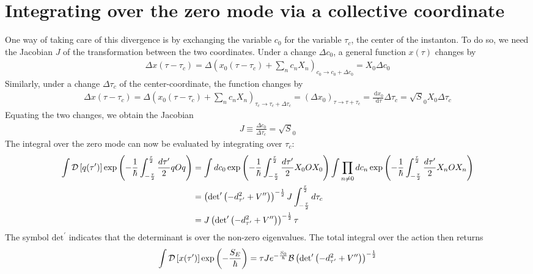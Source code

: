 \documentclass{article}
\begin{document}
\section{Integrating over the zero mode via a collective coordinate}
One way of taking care of this divergence is by exchanging the variable \(c_0\) for the variable \(\tau_c\), the center of the instanton. To do so, we need the Jacobian \(J\) of the transformation between the two coordinates. Under a change \(\Delta c_0\), a general function \(x(\tau)\) changes by
\begin{equation}\begin{aligned}
	\Delta x(\tau - \tau_c) = \Delta \left( x_0(\tau - \tau_c) + \sum_n c_n X_n \right)_{c_0 \to c_0 + \Delta c_0} = X_0 \Delta c_0
\end{aligned}\end{equation}
Similarly, under a change \(\Delta \tau_c\) of the center-coordinate, the function changes by
\begin{equation}\begin{aligned}
	\Delta x(\tau - \tau_c) = \Delta \left( x_0(\tau - \tau_c) + \sum_n c_n X_n \right)_{\tau_c \to \tau_c + \Delta \tau_c} = \left(\Delta x_0\right)_{\tau \to \tau + \tau_c} = \frac{\:\mathrm{d}x_0}{\:\mathrm{d}\tau}\Delta \tau_c = \sqrt S_0 X_0 \Delta \tau_c
\end{aligned}\end{equation}
Equating the two changes, we obtain the Jacobian 
\begin{equation}\begin{aligned}
J \equiv \frac{\Delta c_0}{\Delta \tau_c} = \sqrt S_0
\end{aligned}\end{equation}
The integral over the zero mode can now be evaluated by integrating over \(\tau_c\):
\begin{equation}\begin{aligned}
	\int \mathcal{D}\left[{q(\tau^\prime)}\right]\exp\left({-\frac{1}{\hbar}\int_{-\frac{\tau}{2}}^{\frac{\tau}{2}} \frac{d\tau^\prime}{2} q O q}\right) &= \int dc_0 \exp\left({-\frac{1}{\hbar}\int_{-\frac{\tau}{2}}^{\frac{\tau}{2}} \frac{d\tau^\prime}{2} X_0 O X_0}\right) \int \prod_{n \neq 0}dc_n \exp\left({-\frac{1}{\hbar}\int_{-\frac{\tau}{2}}^{\frac{\tau}{2}} \frac{d\tau^\prime}{2} X_n O X_n}\right)\\
															     &= \left(\text{det}^\prime\left({-d^2_{\tau^\prime}+V^{\prime\prime}}\right)\right)^{-\frac{1}{2}}J\int_{-\frac{\tau}{2}}^{\frac{\tau}{2}} d\tau_c \\
															     &= J\left(\text{det}^\prime\left({-d^2_{\tau^\prime}+V^{\prime\prime}}\right)\right)^{-\frac{1}{2}} \tau
\end{aligned}\end{equation}
The symbol \(\text{det}^\prime\) indicates that the determinant is over the non-zero eigenvalues. The total integral over the action then returns
\begin{equation}\begin{aligned}
	\int \mathcal{D}\left[{x(\tau^\prime)}\right]\exp\left({-\frac{S_E}{\hbar}}\right) =  \tau J e^{-\frac{S_0}{\hbar}} \mathcal{B} \left(\text{det}^\prime\left({-d^2_{\tau^\prime}+V^{\prime\prime}}\right)\right)^{-\frac{1}{2}}
\end{aligned}\end{equation}
\end{document}
